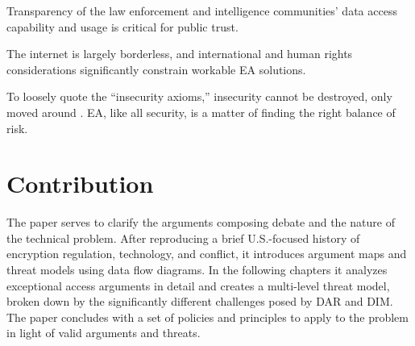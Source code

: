  Transparency of the law enforcement and intelligence communities' data access
capability and usage is critical for public trust.

 The internet is largely borderless, and international and human rights
considerations significantly constrain workable \ac{EA} solutions.

 To loosely quote the ``insecurity axioms,'' insecurity cannot be destroyed, only
moved around \cite{nrc_schneider_1999}. \Ac{EA}, like all security, is a matter of finding the right balance of risk.

\principlesend


\section{Contribution}
\label{sec-contribution}

The paper serves to clarify the arguments composing debate and the nature of the technical problem. After reproducing a
brief U.S.-focused history of encryption regulation, technology, and conflict, it introduces argument maps and threat
models using data flow diagrams. In the following chapters it analyzes exceptional access arguments in detail and
creates a multi-level threat model, broken down by the significantly different challenges posed by \ac{DAR} and
\ac{DIM}. The paper concludes with a set of policies and principles to apply to the problem in light of valid arguments
and threats.
